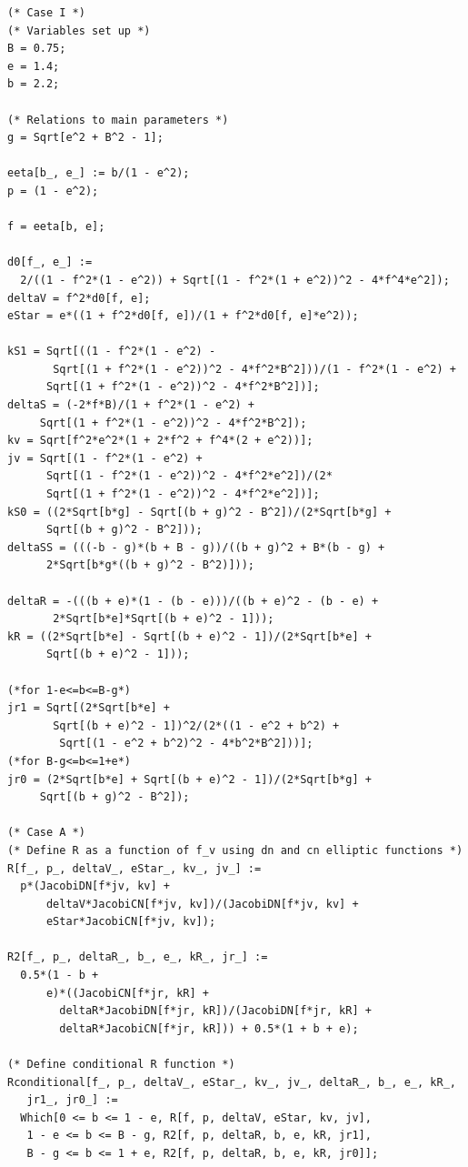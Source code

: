 \documentclass[12pt,oneside]{report}
\theoremstyle{definition}
\begin{document}
\begin{verbatim}
(* Case I *)
(* Variables set up *)
B = 0.75;
e = 1.4;
b = 2.2;

(* Relations to main parameters *)
g = Sqrt[e^2 + B^2 - 1];

eeta[b_, e_] := b/(1 - e^2);
p = (1 - e^2);

f = eeta[b, e];

d0[f_, e_] := 
  2/((1 - f^2*(1 - e^2)) + Sqrt[(1 - f^2*(1 + e^2))^2 - 4*f^4*e^2]);
deltaV = f^2*d0[f, e];
eStar = e*((1 + f^2*d0[f, e])/(1 + f^2*d0[f, e]*e^2));

kS1 = Sqrt[((1 - f^2*(1 - e^2) - 
       Sqrt[(1 + f^2*(1 - e^2))^2 - 4*f^2*B^2]))/(1 - f^2*(1 - e^2) + 
      Sqrt[(1 + f^2*(1 - e^2))^2 - 4*f^2*B^2])];
deltaS = (-2*f*B)/(1 + f^2*(1 - e^2) + 
     Sqrt[(1 + f^2*(1 - e^2))^2 - 4*f^2*B^2]);
kv = Sqrt[f^2*e^2*(1 + 2*f^2 + f^4*(2 + e^2))];
jv = Sqrt[(1 - f^2*(1 - e^2) + 
      Sqrt[(1 - f^2*(1 - e^2))^2 - 4*f^2*e^2])/(2*
      Sqrt[(1 + f^2*(1 - e^2))^2 - 4*f^2*e^2])];
kS0 = ((2*Sqrt[b*g] - Sqrt[(b + g)^2 - B^2])/(2*Sqrt[b*g] + 
      Sqrt[(b + g)^2 - B^2]));
deltaSS = (((-b - g)*(b + B - g))/((b + g)^2 + B*(b - g) + 
      2*Sqrt[b*g*((b + g)^2 - B^2)]));

deltaR = -(((b + e)*(1 - (b - e)))/((b + e)^2 - (b - e) + 
       2*Sqrt[b*e]*Sqrt[(b + e)^2 - 1]));
kR = ((2*Sqrt[b*e] - Sqrt[(b + e)^2 - 1])/(2*Sqrt[b*e] + 
      Sqrt[(b + e)^2 - 1]));

(*for 1-e<=b<=B-g*)
jr1 = Sqrt[(2*Sqrt[b*e] + 
       Sqrt[(b + e)^2 - 1])^2/(2*((1 - e^2 + b^2) + 
        Sqrt[(1 - e^2 + b^2)^2 - 4*b^2*B^2]))];
(*for B-g<=b<=1+e*)
jr0 = (2*Sqrt[b*e] + Sqrt[(b + e)^2 - 1])/(2*Sqrt[b*g] + 
     Sqrt[(b + g)^2 - B^2]);

(* Case A *)
(* Define R as a function of f_v using dn and cn elliptic functions *)
R[f_, p_, deltaV_, eStar_, kv_, jv_] := 
  p*(JacobiDN[f*jv, kv] + 
      deltaV*JacobiCN[f*jv, kv])/(JacobiDN[f*jv, kv] + 
      eStar*JacobiCN[f*jv, kv]);

R2[f_, p_, deltaR_, b_, e_, kR_, jr_] := 
  0.5*(1 - b + 
      e)*((JacobiCN[f*jr, kR] + 
        deltaR*JacobiDN[f*jr, kR])/(JacobiDN[f*jr, kR] + 
        deltaR*JacobiCN[f*jr, kR])) + 0.5*(1 + b + e);

(* Define conditional R function *)
Rconditional[f_, p_, deltaV_, eStar_, kv_, jv_, deltaR_, b_, e_, kR_, 
   jr1_, jr0_] := 
  Which[0 <= b <= 1 - e, R[f, p, deltaV, eStar, kv, jv], 
   1 - e <= b <= B - g, R2[f, p, deltaR, b, e, kR, jr1], 
   B - g <= b <= 1 + e, R2[f, p, deltaR, b, e, kR, jr0]];


\end{verbatim}
\end{document}
